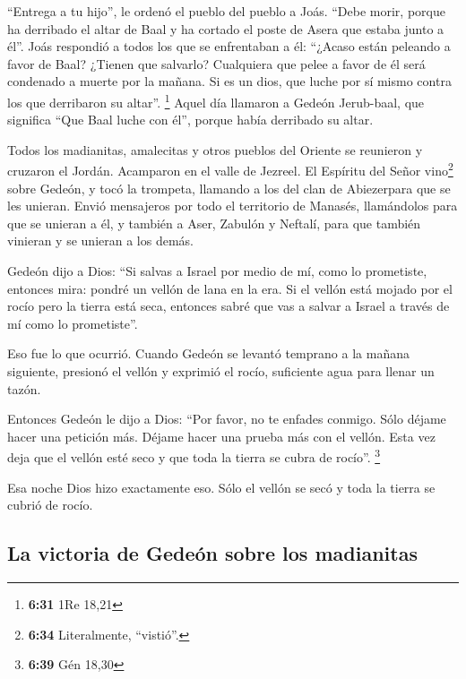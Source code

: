  ``Entrega a tu hijo'', le ordenó el pueblo del pueblo a
Joás. ``Debe morir, porque ha derribado el altar de Baal y ha cortado el
poste de Asera que estaba junto a él''.  Joás respondió a
todos los que se enfrentaban a él: ``¿Acaso están peleando a favor de
Baal? ¿Tienen que salvarlo? Cualquiera que pelee a favor de él será
condenado a muerte por la mañana. Si es un dios, que luche por sí mismo
contra los que derribaron su altar''. \footnote{\textbf{6:31} 1Re 18,21}
 Aquel día llamaron a Gedeón Jerub-baal, que significa
``Que Baal luche con él'', porque había derribado su altar.

 Todos los madianitas, amalecitas y otros pueblos del
Oriente se reunieron y cruzaron el Jordán. Acamparon en el valle de
Jezreel.  El Espíritu del Señor vino\footnote{\textbf{6:34}
  Literalmente, ``vistió''.} sobre Gedeón, y tocó la trompeta, llamando
a los del clan de Abiezerpara que se les unieran.  Envió
mensajeros por todo el territorio de Manasés, llamándolos para que se
unieran a él, y también a Aser, Zabulón y Neftalí, para que también
vinieran y se unieran a los demás.

 Gedeón dijo a Dios: ``Si salvas a Israel por medio de
mí, como lo prometiste,  entonces mira: pondré un vellón
de lana en la era. Si el vellón está mojado por el rocío pero la tierra
está seca, entonces sabré que vas a salvar a Israel a través de mí como
lo prometiste''.

 Eso fue lo que ocurrió. Cuando Gedeón se levantó
temprano a la mañana siguiente, presionó el vellón y exprimió el rocío,
suficiente agua para llenar un tazón.

 Entonces Gedeón le dijo a Dios: ``Por favor, no te
enfades conmigo. Sólo déjame hacer una petición más. Déjame hacer una
prueba más con el vellón. Esta vez deja que el vellón esté seco y que
toda la tierra se cubra de rocío''. \footnote{\textbf{6:39} Gén 18,30}

 Esa noche Dios hizo exactamente eso. Sólo el vellón se
secó y toda la tierra se cubrió de rocío.

\hypertarget{la-victoria-de-gedeuxf3n-sobre-los-madianitas}{%
\subsection{La victoria de Gedeón sobre los
madianitas}\label{la-victoria-de-gedeuxf3n-sobre-los-madianitas}}

